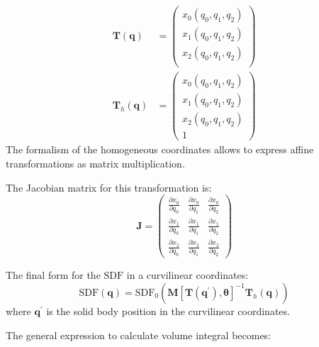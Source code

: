 \documentclass[10pt, a4paper]{article}
\begin{document}
\begin{multicols}{2}
\begin{align}
    \bm{T}(\bm{q}) &= 
    \begin{pmatrix}
        x_0(q_0, q_1, q_2)\\
        x_1(q_0, q_1, q_2)\\
        x_2(q_0, q_1, q_2)\\
    \end{pmatrix}
    \\
    \bm{T}_h(\bm{q}) &= 
    \begin{pmatrix}
        x_0(q_0, q_1, q_2)\\
        x_1(q_0, q_1, q_2)\\
        x_2(q_0, q_1, q_2)\\
        1
    \end{pmatrix}
\end{align}
The formalism of the homogeneous coordinates allows to express affine transformations as matrix multiplication.

The Jacobian matrix for this transformation is:
\begin{equation}
    \bm{J} = \begin{pmatrix}
    \frac{\partial x_0}{\partial q_0} & \frac{\partial x_0}{\partial q_1} & \frac{\partial x_0}{\partial q_2} \\
    \frac{\partial x_1}{\partial q_0} & \frac{\partial x_1}{\partial q_1} & \frac{\partial x_1}{\partial q_2} \\
    \frac{\partial x_2}{\partial q_0} & \frac{\partial x_2}{\partial q_1} & \frac{\partial x_2}{\partial q_2}
    \end{pmatrix}
\end{equation}

The final form for the $\textrm{SDF}$ in a curvilinear coordinates:
\begin{equation}\label{eq:transform_SDF}
    \textrm{SDF}(\bm{q}) = \textrm{SDF}_{0}\left(\bm{M}[\bm{T}(\bm{q}^\prime), \bm{\theta}]^{-1} \bm{T}_h(\bm{q})\right)
\end{equation}
where $\bm{q}^\prime$ is the solid body position in the curvilinear coordinates.


The general expression to calculate volume integral becomes:


\end{multicols}
\end{document}
